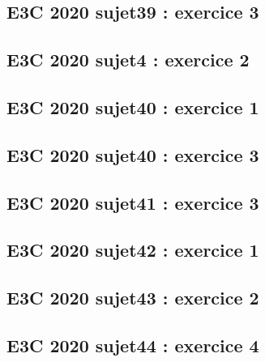 \documentclass[lang=fr,edition=teacher,layout=sheet]{mxbook}
\begin{document}
\par\bigskip
{}\subsection*{E3C 2020 sujet39 : exercice 3}
\begingroup\endgroup
\par\bigskip
{}\subsection*{E3C 2020 sujet4 : exercice 2}
\begingroup\endgroup
\par\bigskip
{}\subsection*{E3C 2020 sujet40 : exercice 1}
\begingroup\endgroup
\par\bigskip
{}\subsection*{E3C 2020 sujet40 : exercice 3}
\begingroup\endgroup
\par\bigskip
{}\subsection*{E3C 2020 sujet41 : exercice 3}
\begingroup\endgroup
\par\bigskip
{}\subsection*{E3C 2020 sujet42 : exercice 1}
\begingroup\endgroup
\par\bigskip
{}\subsection*{E3C 2020 sujet43 : exercice 2}
\begingroup\endgroup
\par\bigskip
{}\subsection*{E3C 2020 sujet44 : exercice 4}
\end{document}
